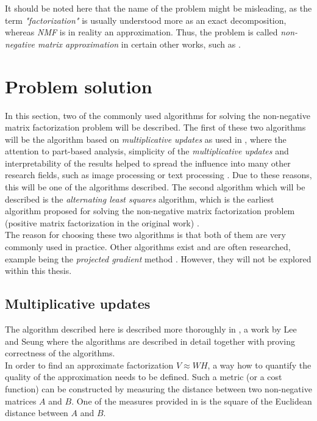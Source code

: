 \documentclass[thesis=M,english]{FITthesis}[2012/10/20]
\begin{document}
It should be noted here that the name of the problem might be misleading, as
the term \emph{"factorization"} is usually understood more as an exact
decomposition, whereas \emph{NMF} is in reality an approximation. Thus,
the problem is called \emph{non-negative matrix approximation} in certain
other works, such as \cite{nmf-approx}.

\section{Problem solution}
In this section, two of the commonly used algorithms for solving the
non-negative matrix factorization problem will be described. The
first of these two algorithms will be the algorithm based on
\emph{multiplicative updates} as used in \cite{lee99}, where the
attention to part-based analysis, simplicity of the \emph{multiplicative
updates} and interpretability of the results helped to spread the influence
into many other research fields, such as image processing or text
processing \cite{nmf-phd-thesis}. Due to these reasons, this will be one of the algorithms
described. The second algorithm which will be described is the \emph{alternating
least squares} algorithm, which is the earliest algorithm proposed for solving
the non-negative matrix factorization problem (positive matrix factorization
in the original work) \cite{nmf-paatero}.
\\

The reason for choosing these two algorithms is that both of them are very
commonly used in practice. Other algorithms exist and are often researched,
example being the \emph{projected gradient} method \cite{projected-gradient}.
However, they will not be explored within this thesis.

\subsection{Multiplicative updates}
The algorithm described here is described more thoroughly in \cite{lee-algos},
a work by Lee and Seung where the algorithms are described in detail together
with proving correctness of the algorithms.
\\

In order to find an approximate factorization $V \approx WH$, a way how to
quantify the quality of the approximation needs to be defined. Such a metric
(or a cost function) can be constructed by measuring the distance between
two non-negative matrices $A$ and $B$. One of the measures provided in
\cite{lee-algos} is the square of the Euclidean distance between $A$ and $B$.
\end{document}
